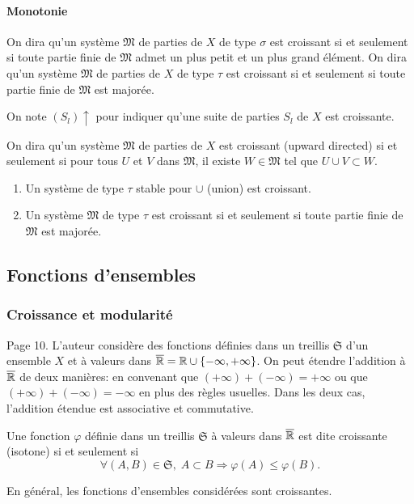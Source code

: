 \paragraph{Monotonie}
On dira qu'un système $\mathfrak{M}$ de parties de $X$ de type $\sigma$ est croissant si et seulement si toute partie finie de $\mathfrak{M}$ admet un plus petit et un plus grand élément.\newline
On dira qu'un système $\mathfrak{M}$ de parties de $X$ de type $\tau$ est croissant si et seulement si toute partie finie de $\mathfrak{M}$ est majorée.

On note $(S_l)\uparrow$ pour indiquer qu'une suite de parties $S_l$ de $X$ est croissante.

On dira qu'un système $\mathfrak{M}$ de parties de $X$ est croissant (upward directed) si et seulement si pour tous $U$ et $V$ dans $\mathfrak{M}$, il existe $W\in \mathfrak{M}$ tel que $U \cup V \subset W$.
\begin{rems}
 \begin{enumerate}
  \item Un système de type $\tau$ stable pour $\cup$ (union) est croissant.
  \item Un système $\mathfrak{M}$ de type $\tau$ est croissant si et seulement si toute partie finie de $\mathfrak{M}$ est majorée.
 \end{enumerate}
\end{rems}


\subsection{Fonctions d'ensembles}\label{FoncEns}
\subsubsection{Croissance et modularité}
Page 10. L'auteur considère des fonctions définies dans un treillis $\mathfrak{S}$ d'un ensemble $X$ et à valeurs dans $\overline{\mathbb{R}}= \mathbb{R} \cup\{- \infty, + \infty\} $. On peut étendre l'addition à $\overline{\mathbb{R}}$ de deux manières: en convenant que $(+ \infty) + (-\infty) = + \infty$ ou que $(+ \infty) + (-\infty) = - \infty$ en plus des règles usuelles. Dans les deux cas, l'addition étendue est associative et commutative.

\begin{defi}
  Une fonction $\varphi$ définie dans un treillis $\mathfrak{S}$ à valeurs dans $\overline{\mathbb{R}}$ est dite croissante (isotone) si et seulement si
  \begin{displaymath}
    \forall (A,B) \in \mathfrak{S},\; A \subset B \Rightarrow \varphi(A) \leq \varphi(B).
  \end{displaymath}
\end{defi}
\noindent En général, les fonctions d'ensembles considérées sont croissantes.

